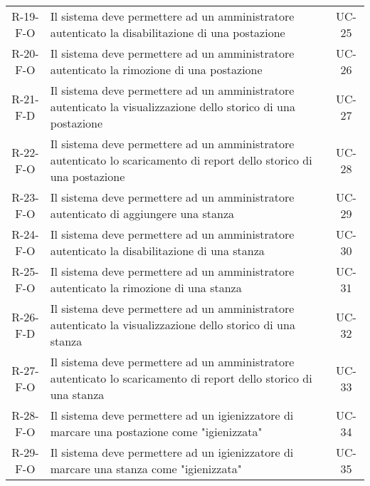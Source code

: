 \begin{longtable}{ c C{9cm} c }
    R-19-F-O & Il sistema deve permettere ad un amministratore autenticato la disabilitazione di una postazione & UC-25 \\
    R-20-F-O & Il sistema deve permettere ad un amministratore autenticato la rimozione di una postazione & UC-26 \\
    R-21-F-D & Il sistema deve permettere ad un amministratore autenticato la visualizzazione dello storico di una postazione & UC-27 \\
    R-22-F-O & Il sistema deve permettere ad un amministratore autenticato lo scaricamento di report dello storico di una postazione & UC-28 \\
    R-23-F-O & Il sistema deve permettere ad un amministratore autenticato di aggiungere una stanza & UC-29 \\
    R-24-F-O & Il sistema deve permettere ad un amministratore autenticato la disabilitazione di una stanza & UC-30 \\
    R-25-F-O & Il sistema deve permettere ad un amministratore autenticato la rimozione di una stanza & UC-31 \\
    R-26-F-D & Il sistema deve permettere ad un amministratore autenticato la visualizzazione dello storico di una stanza & UC-32 \\
    R-27-F-O & Il sistema deve permettere ad un amministratore autenticato lo scaricamento di report dello storico di una stanza & UC-33 \\
    R-28-F-O & Il sistema deve permettere ad un igienizzatore di marcare una postazione come "igienizzata" & UC-34 \\
    R-29-F-O & Il sistema deve permettere ad un igienizzatore di marcare una stanza come "igienizzata" & UC-35 \\
     


\end{longtable}




